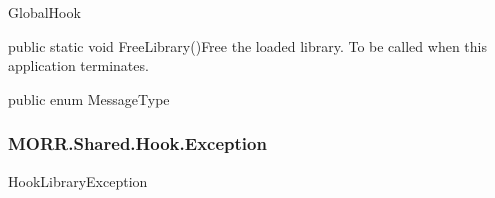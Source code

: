 \begin{class}{GlobalHook}
\begin{methods}
		\begin{method}{public static void FreeLibrary()}{Free the loaded library. To be called when this application terminates.}
		\end{method}
	\end{methods}
	
	\begin{enum}{public enum MessageType}
	
		
	\end{enum}
\end{class}


\subsubsection*{MORR.Shared.Hook.Exception}

\begin{class}{HookLibraryException}
	
	
	
\end{class}